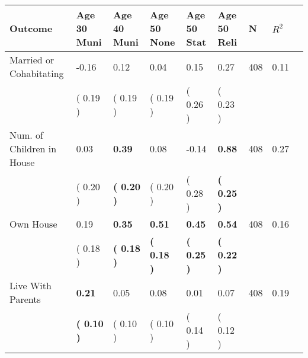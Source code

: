 \begin{tabular}{L{6.2cm} C{1.8cm} C{1.8cm} C{1.8cm} C{1.8cm} C{1.8cm} C{1.8cm} C{0.3cm} C{0.3cm}}
\toprule
 \textbf{Outcome} & \textbf{Age 30 Muni} & \textbf{Age 40 Muni} & \textbf{Age 50 None} & \textbf{Age 50 Stat} & \textbf{Age 50 Reli} & \textbf{N} & \textbf{$ R^2$} \\
\midrule
Married or Cohabitating &     -0.16 &      0.12 &      0.04 &      0.15 &      0.27  & 408 &       0.11 \\ 
 & (     0.19 ) & (     0.19 ) & (     0.19 ) & (     0.26 ) & (     0.23 )  & \\
Num. of Children in House &      0.03 & \textbf{     0.39} &      0.08 &     -0.14 & \textbf{     0.88}  & 408 &       0.27 \\ 
 & (     0.20 ) & \textbf{(     0.20 )} & (     0.20 ) & (     0.28 ) & \textbf{(     0.25 )}  & \\
Own House &      0.19 & \textbf{     0.35} & \textbf{     0.51} & \textbf{     0.45} & \textbf{     0.54}  & 408 &       0.16 \\ 
 & (     0.18 ) & \textbf{(     0.18 )} & \textbf{(     0.18 )} & \textbf{(     0.25 )} & \textbf{(     0.22 )}  & \\
Live With Parents & \textbf{     0.21} &      0.05 &      0.08 &      0.01 &      0.07  & 408 &       0.19 \\ 
 & \textbf{(     0.10 )} & (     0.10 ) & (     0.10 ) & (     0.14 ) & (     0.12 )  & \\
\bottomrule
\end{tabular}
